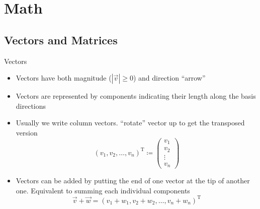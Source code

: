 

\subtitle{Part I -- Math and Minimisers}


  \maketitle

  \section{Math}

  \subsection{Vectors and Matrices}

  \begin{frame}{Vectors}
    \begin{itemize}
      \item Vectors have both magnitude ($|\vec{v}| \geq 0$) and direction
        \rightarrow \enquote{arrow}
      \item Vectors are represented by components indicating their length
        along the basis directions
      \item Usually we write column vectors.
        \enquote{rotate} vector up to get the transposed version
        \begin{equation*}
          \left(v_1, v_2, \dots, v_n\right)^\mathrm{T} \coloneqq
          \begin{pmatrix} v_1 \\ v_2 \\ \vdots \\ v_n \end{pmatrix}
        \end{equation*}
      \item Vectors can be added by putting the end of one vector at the tip
        of another one. Equivalent to summing each individual components
        \begin{equation*}
          \vec{v} + \vec{w} =
            \left(v_1 + w_1, v_2 + w_2, \dots, v_n + w_n\right)^\mathrm{T}
        \end{equation*}
    \end{itemize}
  \end{frame}

